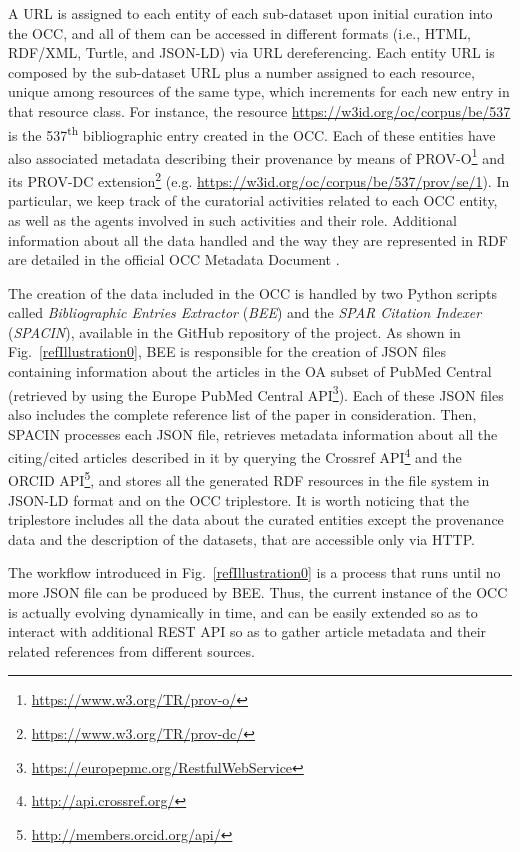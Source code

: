 \documentclass[runningheads,a4paper]{llncs}
\begin{document}
A URL is assigned to each entity of each sub-dataset upon initial curation into the OCC, and all of them can be accessed in different formats (i.e., HTML, RDF/XML, Turtle, and JSON-LD) via URL dereferencing. Each entity URL is composed by the sub-dataset URL plus a number assigned to each resource, unique among resources of the same type, which increments for each new entry in that resource class. For instance, the resource \url{https://w3id.org/oc/corpus/be/537} is the 537\textsuperscript{th} bibliographic entry created in the OCC. Each of these entities have also associated metadata describing their provenance by means of PROV-O\footnote{\url{https://www.w3.org/TR/prov-o/}} and its PROV-DC extension\footnote{\url{https://www.w3.org/TR/prov-dc/}} (e.g. \url{https://w3id.org/oc/corpus/be/537/prov/se/1}). In particular, we keep track of the curatorial activities related to each OCC entity, as well as the agents involved in such activities and their role. Additional information about all the data handled and the way they are represented in RDF are detailed in the official OCC Metadata Document  \cite{__RefNumPara__19_1852566440}.

The creation of the data included in the OCC is handled by two Python scripts called {\em Bibliographic Entries Extractor} ({\em BEE}) and the {\em SPAR Citation Indexer} ({\em SPACIN}), available in the GitHub repository of the project. As shown in Fig.~\ref{refIllustration0}, BEE is responsible for the creation of JSON files containing information about the articles in the OA subset of PubMed Central (retrieved by using the Europe PubMed Central API\footnote{\url{https://europepmc.org/RestfulWebService}}). Each of these JSON files also includes the complete reference list of the paper in consideration. Then, SPACIN processes each JSON file, retrieves metadata information about all the citing/cited articles described in it by querying the Crossref API\footnote{\url{http://api.crossref.org/}} and the ORCID API\footnote{\url{http://members.orcid.org/api/}}, and stores all the generated RDF resources in the file system in JSON-LD format and on the OCC triplestore. It is worth noticing that the triplestore includes all the data about the curated entities except the provenance data and the description of the datasets, that are accessible only via HTTP.

The workflow introduced in Fig.~\ref{refIllustration0} is a process that runs until no more JSON file can be produced by BEE. Thus, the current instance of the OCC is actually evolving dynamically in time, and can be easily extended so as to interact with additional REST API so as to gather article metadata and their related references from different sources.
\end{document}
